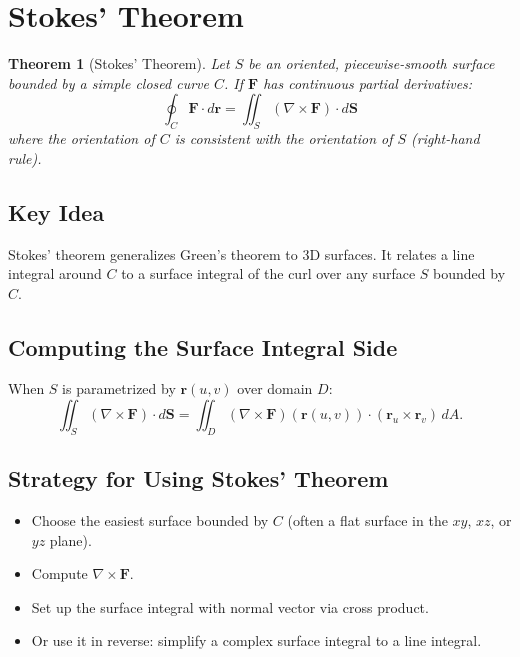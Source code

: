\documentclass[12pt]{article}
\newcommand{\curl}{\nabla\times}
\newtheorem{theorem}{Theorem}
\begin{document}
\section{Stokes' Theorem}

\begin{theorem}[Stokes' Theorem]
Let \(S\) be an oriented, piecewise-smooth surface bounded by a simple closed curve \(C\). If \(\mathbf{F}\) has continuous partial derivatives:
\[
\boxed{\oint_C \mathbf{F}\cdot d\mathbf{r} = \iint_S (\curl\mathbf{F})\cdot d\mathbf{S}}
\]
where the orientation of \(C\) is consistent with the orientation of \(S\) (right-hand rule).
\end{theorem}

\subsection{Key Idea}
Stokes' theorem generalizes Green's theorem to 3D surfaces. It relates a line integral around \(C\) to a surface integral of the curl over any surface \(S\) bounded by \(C\).

\subsection{Computing the Surface Integral Side}
When \(S\) is parametrized by \(\mathbf{r}(u,v)\) over domain \(D\):
\[
\iint_S (\curl\mathbf{F})\cdot d\mathbf{S} = \iint_D (\curl\mathbf{F})(\mathbf{r}(u,v))\cdot (\mathbf{r}_u\times\mathbf{r}_v)\,dA.
\]

\subsection{Strategy for Using Stokes' Theorem}
\begin{itemize}
    \item Choose the easiest surface bounded by \(C\) (often a flat surface in the \(xy\), \(xz\), or \(yz\) plane).
    \item Compute \(\curl\mathbf{F}\).
    \item Set up the surface integral with normal vector via cross product.
    \item Or use it in reverse: simplify a complex surface integral to a line integral.
\end{itemize}
\end{document}
